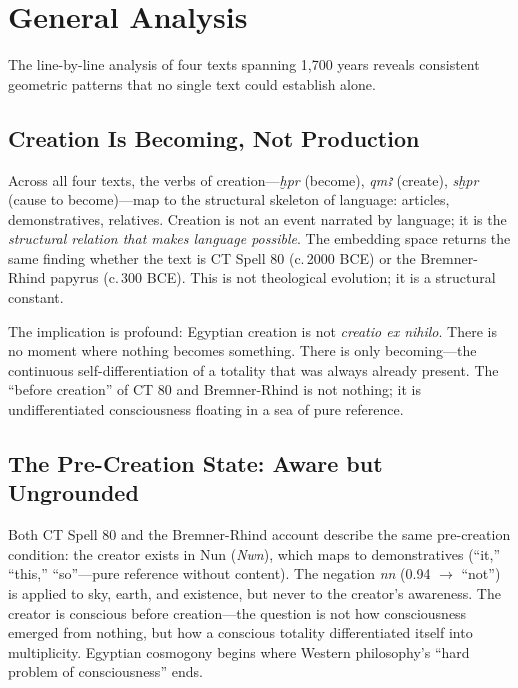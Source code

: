 \documentclass[11pt, a4paper]{article}
\begin{document}
\section{General Analysis}
\label{sec:general}

The line-by-line analysis of four texts spanning 1,700 years reveals consistent geometric patterns that no single text could establish alone.

\subsection{Creation Is Becoming, Not Production}

Across all four texts, the verbs of creation---\textit{ḫpr} (become), \textit{qmꜣ} (create), \textit{sḫpr} (cause to become)---map to the structural skeleton of language: articles, demonstratives, relatives. Creation is not an event narrated by language; it is the \textit{structural relation that makes language possible}. The embedding space returns the same finding whether the text is CT Spell 80 (c.\,2000 BCE) or the Bremner-Rhind papyrus (c.\,300 BCE). This is not theological evolution; it is a structural constant.

The implication is profound: Egyptian creation is not \textit{creatio ex nihilo}. There is no moment where nothing becomes something. There is only becoming---the continuous self-differentiation of a totality that was always already present. The ``before creation'' of CT 80 and Bremner-Rhind is not nothing; it is undifferentiated consciousness floating in a sea of pure reference.

\subsection{The Pre-Creation State: Aware but Ungrounded}

Both CT Spell 80 and the Bremner-Rhind account describe the same pre-creation condition: the creator exists in Nun (\textit{Nwn}), which maps to demonstratives (``it,'' ``this,'' ``so''---pure reference without content). The negation \textit{nn} (0.94 $\to$ ``not'') is applied to sky, earth, and existence, but never to the creator's awareness. The creator is conscious before creation---the question is not how consciousness emerged from nothing, but how a conscious totality differentiated itself into multiplicity. Egyptian cosmogony begins where Western philosophy's ``hard problem of consciousness'' ends.
\end{document}
